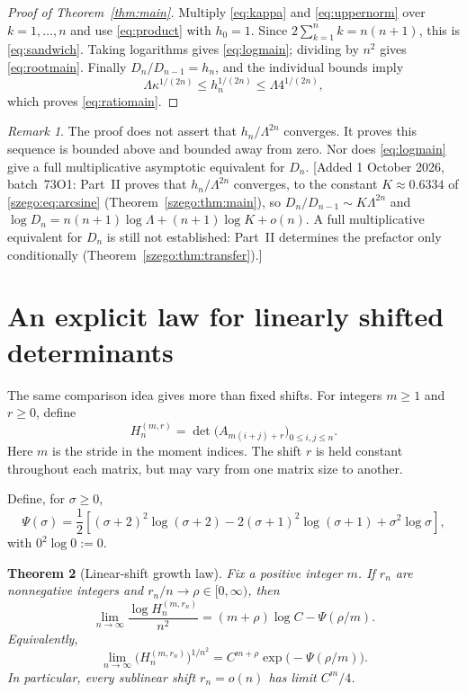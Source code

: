 \documentclass[11pt,a4paper]{article}
\numberwithin{equation}{section}
\newtheorem{theorem}{Theorem}[section]
\theoremstyle{remark}\newtheorem{remark}[theorem]{Remark}
\begin{document}
\begin{proof}[Proof of Theorem~\ref{thm:main}]
Multiply \eqref{eq:kappa} and \eqref{eq:uppernorm} over $k=1,\ldots,n$ and
use \eqref{eq:product} with $h_0=1$. Since $2\sum_{k=1}^n k=n(n+1)$, this
is \eqref{eq:sandwich}. Taking logarithms gives \eqref{eq:logmain}; dividing
by $n^2$ gives \eqref{eq:rootmain}. Finally $D_n/D_{n-1}=h_n$, and the
individual bounds imply
\[
 \Lambda\kappa^{1/(2n)}\leq h_n^{1/(2n)}\leq\Lambda4^{1/(2n)},
\]
which proves \eqref{eq:ratiomain}.
\end{proof}

\begin{remark}
The proof does not assert that $h_n/\Lambda^{2n}$ converges. It proves this
sequence is bounded above and bounded away from zero. Nor does
\eqref{eq:logmain} give a full multiplicative asymptotic equivalent for $D_n$.
[Added 1 October 2026, batch~73O1: Part~II proves that $h_n/\Lambda^{2n}$
converges, to the constant $K\approx0.6334$ of \eqref{szego:eq:arcsine}
(Theorem~\ref{szego:thm:main}), so $D_n/D_{n-1}\sim K\Lambda^{2n}$ and
$\log D_n=n(n+1)\log\Lambda+(n+1)\log K+o(n)$. A full multiplicative
equivalent for $D_n$ is still not established: Part~II determines the
prefactor only conditionally (Theorem~\ref{szego:thm:transfer}).]
\end{remark}

\section{An explicit law for linearly shifted determinants}
\label{sec:shifts}
The same comparison idea gives more than fixed shifts. For integers $m\geq1$
and $r\geq0$, define
\begin{equation}\label{eq:shiftdef}
 H_n^{(m,r)}=\det\bigl(A_{m(i+j)+r}\bigr)_{0\leq i,j\leq n}.
\end{equation}
Here $m$ is the stride in the moment indices. The shift $r$ is held constant
throughout each matrix, but may vary from one matrix size to another.

Define, for $\sigma\geq0$,
\begin{equation}\label{eq:Psi}
 \Psi(\sigma)=\frac12\left[
 (\sigma+2)^2\log(\sigma+2)-2(\sigma+1)^2\log(\sigma+1)
 +\sigma^2\log\sigma\right],
\end{equation}
with $0^2\log0:=0$.

\begin{theorem}[Linear-shift growth law]\label{thm:shift}
Fix a positive integer $m$. If $r_n$ are nonnegative integers and
$r_n/n\to\rho\in[0,\infty)$, then
\begin{equation}\label{eq:shiftlaw}
 \lim_{n\to\infty}\frac{\log H_n^{(m,r_n)}}{n^2}
 =(m+\rho)\log C-\Psi(\rho/m).
\end{equation}
Equivalently,
\[
 \lim_{n\to\infty}\bigl(H_n^{(m,r_n)}\bigr)^{1/n^2}
 =C^{m+\rho}\exp\bigl(-\Psi(\rho/m)\bigr).
\]
In particular, every sublinear shift $r_n=o(n)$ has limit $C^m/4$.
\end{theorem}
\end{document}
